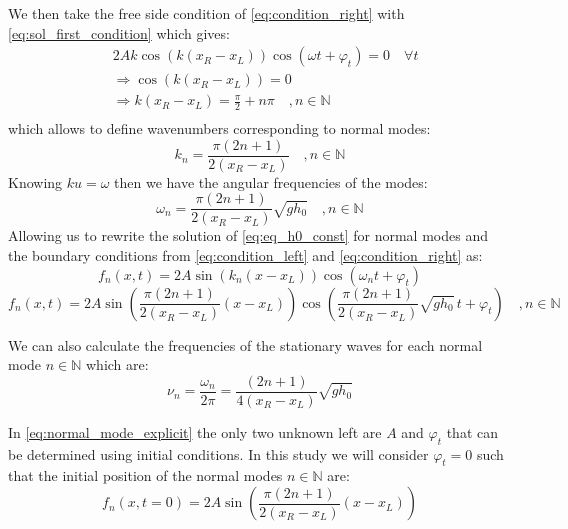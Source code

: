 We then take the free side condition of \autoref{eq:condition_right} with \autoref{eq:sol_first_condition} which gives:
\[
    \begin{aligned}
        & 2A k \cos(k(x_R-x_L))\cos(\omega t + \varphi_t) = 0 \quad \forall t \\
        & \Rightarrow \cos(k(x_R-x_L)) = 0 \\
        & \Rightarrow k(x_R-x_L) = \frac{\pi}{2} + n\pi \quad , n \in \mathbb{N} \\
    \end{aligned}
\]
which allows to define wavenumbers corresponding to normal modes:
\begin{equation}
    k_n = \frac{\pi(2n + 1)}{2(x_R-x_L)} \quad , n \in \mathbb{N}
    \label{eq:wavenumber_mode}
\end{equation}
Knowing $ku = \omega$ then we have the angular frequencies of the modes:
\begin{equation}
    \omega_n = \frac{\pi(2n + 1)}{2(x_R-x_L)} \sqrt{gh_0} \quad , n \in \mathbb{N}
    \label{eq:angular_mode}
\end{equation}
Allowing us to rewrite the solution of \autoref{eq:eq_h0_const} for normal modes and the boundary conditions from \autoref{eq:condition_left} and \autoref{eq:condition_right} as:
\begin{equation}
    f_n(x,t) = 2A\sin(k_n(x - x_L))\cos(\omega_n t + \varphi_t)
    \label{eq:normal_mode_simple}
\end{equation}
\begin{equation}
    f_n(x,t) = 2A\sin\left(\frac{\pi(2n + 1)}{2(x_R-x_L)}(x - x_L)\right)\cos\left(\frac{\pi(2n + 1)}{2(x_R-x_L)} \sqrt{gh_0} \, t + \varphi_t\right) \quad , n \in \mathbb{N}
    \label{eq:normal_mode_explicit}
\end{equation}

We can also calculate the frequencies of the stationary waves for each normal mode $n \in \mathbb{N}$ which are:
\begin{equation}
    \nu_n = \frac{\omega_n}{2\pi} = \frac{(2n + 1)}{4(x_R-x_L)} \sqrt{gh_0}
\end{equation}

In \autoref{eq:normal_mode_explicit} the only two unknown left are $A$ and $\varphi_t$ that can be determined using initial conditions. In this study we will consider $\varphi_t = 0$ such that the initial position of the normal modes $n \in \mathbb{N}$ are:
\begin{equation}
    f_n(x,t=0) = 2A\sin\left(\frac{\pi(2n + 1)}{2(x_R-x_L)}(x - x_L)\right)
    \label{eq:normal_initial}
\end{equation}


